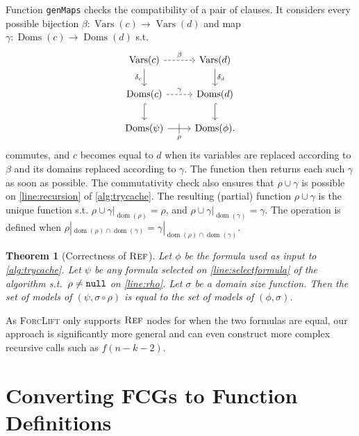 \documentclass{article}
\newtheorem{theorem}{Theorem}
\theoremstyle{definition}
\theoremstyle{remark}
\DeclareMathOperator{\Reff}{\textsc{Ref}}
\DeclareMathOperator{\dom}{dom}
\DeclareMathOperator{\Doms}{Doms}
\DeclareMathOperator{\Vars}{Vars}
\begin{document}
Function \texttt{genMaps} checks the compatibility of a pair of clauses. It
considers every possible bijection $\beta\colon \Vars(c) \to \Vars(d)$ and map
$\gamma\colon \Doms(c) \to \Doms(d)$ s.t.
\[
  \begin{tikzcd}
    \Vars(c) \ar[r, dashed, "\beta"] \arrow[d, swap, "\delta_c"] & \Vars(d) \ar[d, "\delta_d"] \\
    \Doms(c) \ar[r, dashed, "\gamma"] \ar[d, hookrightarrow] & \Doms(d) \ar[d, hookrightarrow] \\
    \Doms(\psi) \ar[r, swap, "\rho", "|" marking, outer sep=5pt] & \Doms(\phi).
  \end{tikzcd}
\]
commutes, and $c$ becomes equal to $d$ when its variables are replaced according
to $\beta$ and its domains replaced according to $\gamma$. The function then
returns each such $\gamma$ as soon as possible. The commutativity check also
ensures that $\rho \cup \gamma$ is possible on \cref{line:recursion} of
\cref{alg:trycache}. The resulting (partial) function $\rho \cup \gamma$ is the
unique function s.t. $\rho \cup \gamma|_{\dom(\rho)} = \rho$, and
$\rho \cup \gamma|_{\dom(\gamma)} = \gamma$. The operation is defined when
$\rho|_{\dom(\rho)\cap\dom(\gamma)} = \gamma|_{\dom(\rho)\cap\dom(\gamma)}$.

\begin{theorem}[Correctness of $\Reff$]
  Let $\phi$ be the formula used as input to \cref{alg:trycache}. Let $\psi$ be
  any formula selected on \cref{line:selectformula} of the algorithm s.t.\
  $\rho \ne {\normalfont\texttt{null}}$ on \cref{line:rho}. Let $\sigma$ be a
  domain size function. Then the set of models of $(\psi, \sigma \circ \rho)$ is
  equal to the set of models of $(\phi, \sigma)$.
\end{theorem}

As \textsc{ForcLift} only supports $\Reff$ nodes for when the two formulas are
equal, our approach is significantly more general and can even construct more
complex recursive calls such as $f(n-k-2)$.

\section{Converting FCGs to Function Definitions}\label{sec:interpret}
\end{document}
